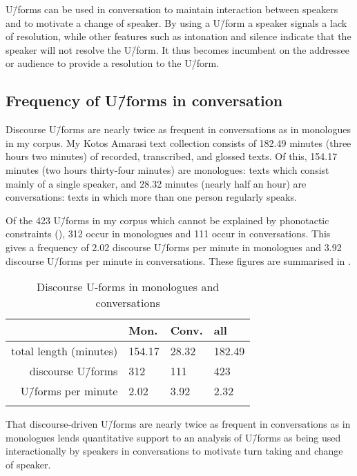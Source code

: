 U\=/forms can be used in conversation to maintain interaction
between speakers and to motivate a change of speaker.
By using a U\=/form a speaker signals a lack of resolution,
while other features such as intonation
and silence indicate that the speaker will not resolve the U\=/form.
It thus becomes incumbent on the addressee or audience
to provide a resolution to the U\=/form.

\subsection{Frequency of U\=/forms in conversation}\label{sec:FreUfoCon}
Discourse U\=/forms are nearly twice as frequent in conversations as in monologues in my corpus.
My Kotos Amarasi text collection consists of 182.49 minutes (three hours two minutes)
of recorded, transcribed, and glossed texts.
Of this, 154.17 minutes (two hours thirty-four minutes)
are monologues: texts which consist mainly of a single speaker,
and 28.32 minutes (nearly half an hour) are conversations:
texts in which more than one person regularly speaks.

Of the 423 U\=/forms in my corpus which
cannot be explained by phonotactic constraints (),
312 occur in monologues and 111 occur in conversations.
This gives a frequency of 2.02 discourse U\=/forms per minute in monologues
and 3.92 discourse U\=/forms per minute in conversations.
These figures are summarised in .

\begin{table}[h]
	\caption{Discourse U-forms in monologues and conversations}\label{tab:VerUfoConMon}
	\centering
		\begin{tabular}{rlll} \lsptoprule
															& Mon.	& Conv. & all			\\ \midrule
			total length (minutes)	& 154.17& 28.32	& 182.49	\\
			discourse U\=/forms				& 312		& 111		& 423			\\
			U\=/forms per minute			&	2.02	&	3.92	&	2.32		\\
			\lspbottomrule
		\end{tabular}
\end{table}

That discourse-driven U\=/forms are nearly twice as frequent in conversations
as in monologues lends quantitative support to an analysis of U\=/forms
as being used interactionally by speakers in conversations
to motivate turn taking and change of speaker.

